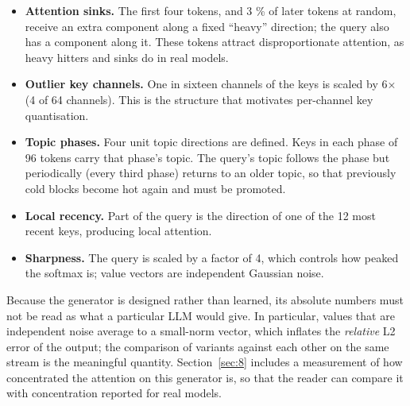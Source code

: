 \documentclass[12pt,a4paper]{report}
\begin{document}
\begin{itemize}
\item \textbf{Attention sinks.} The first four tokens, and 3 \% of later tokens at random, receive an extra component along a fixed “heavy” direction; the query also has a component along it. These tokens attract disproportionate attention, as heavy hitters and sinks do in real models.
\item \textbf{Outlier key channels.} One in sixteen channels of the keys is scaled by 6× (4 of 64 channels). This is the structure that motivates per-channel key quantisation.
\item \textbf{Topic phases.} Four unit topic directions are defined. Keys in each phase of 96 tokens carry that phase's topic. The query's topic follows the phase but periodically (every third phase) returns to an older topic, so that previously cold blocks become hot again and must be promoted.
\item \textbf{Local recency.} Part of the query is the direction of one of the 12 most recent keys, producing local attention.
\item \textbf{Sharpness.} The query is scaled by a factor of 4, which controls how peaked the softmax is; value vectors are independent Gaussian noise.
\end{itemize}
Because the generator is designed rather than learned, its absolute numbers must not be read as what a particular LLM would give. In particular, values that are independent noise average to a small-norm vector, which inflates the \textit{relative} L2 error of the output; the comparison of variants against each other on the same stream is the meaningful quantity. Section~\ref{sec:8} includes a measurement of how concentrated the attention on this generator is, so that the reader can compare it with concentration reported for real models.
\end{document}
